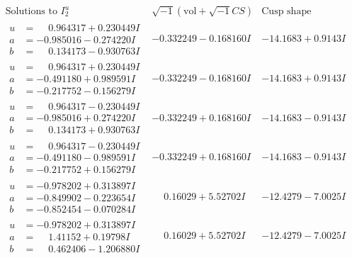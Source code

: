 \documentclass[1p]{elsarticle_modified}
\theoremstyle{definition}
\newcommand{\I}{\sqrt{-1}}
\begin{document}
$$\begin{array}{c|c|c}  
\text{Solutions to }I^u_{2}& \I (\text{vol} + \sqrt{-1}CS) & \text{Cusp shape}\\
 \hline 
\begin{aligned}
u &= \phantom{-}0.964317 + 0.230449 I \\
a &= -0.985016 - 0.274220 I \\
b &= \phantom{-}0.134173 - 0.930763 I\end{aligned}
 & -0.332249 - 0.168160 I & -14.1683 + 0.9143 I \\ \hline\begin{aligned}
u &= \phantom{-}0.964317 + 0.230449 I \\
a &= -0.491180 + 0.989591 I \\
b &= -0.217752 - 0.156279 I\end{aligned}
 & -0.332249 - 0.168160 I & -14.1683 + 0.9143 I \\ \hline\begin{aligned}
u &= \phantom{-}0.964317 - 0.230449 I \\
a &= -0.985016 + 0.274220 I \\
b &= \phantom{-}0.134173 + 0.930763 I\end{aligned}
 & -0.332249 + 0.168160 I & -14.1683 - 0.9143 I \\ \hline\begin{aligned}
u &= \phantom{-}0.964317 - 0.230449 I \\
a &= -0.491180 - 0.989591 I \\
b &= -0.217752 + 0.156279 I\end{aligned}
 & -0.332249 + 0.168160 I & -14.1683 - 0.9143 I \\ \hline\begin{aligned}
u &= -0.978202 + 0.313897 I \\
a &= -0.849902 - 0.223654 I \\
b &= -0.852454 - 0.070284 I\end{aligned}
 & \phantom{-}0.16029 + 5.52702 I & -12.4279 - 7.0025 I \\ \hline\begin{aligned}
u &= -0.978202 + 0.313897 I \\
a &= \phantom{-}1.41152 + 0.19798 I \\
b &= \phantom{-}0.462406 - 1.206880 I\end{aligned}
 & \phantom{-}0.16029 + 5.52702 I & -12.4279 - 7.0025 I \\ \hline\begin{aligned}

\end{aligned}
\end{array}$$
\end{document}
